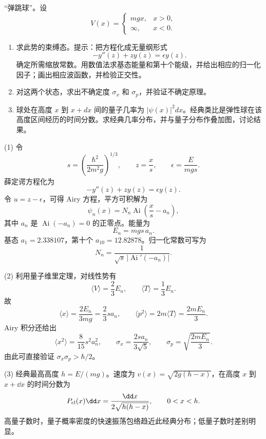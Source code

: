 \begin{question}
“弹跳球”。设
\[
V(x)=\begin{cases}mgx,&x>0,\\ \infty,&x<0.
\end{cases}
\]
\begin{enumerate}
\item 求此势的束缚态。提示：把方程化成无量纲形式
\[
-y''(z)+zy(z)=\epsilon y(z).
\]
确定所需缩放常数。用数值法求基态能量和第十个能级，并给出相应的归一化因子；画出相应波函数，并检验正交性。
\item 对这两个状态，求出不确定度 $\sigma_x$ 和 $\sigma_p$，并验证不确定原理。
\item 球处在高度 $x$ 到 $x+dx$ 间的量子几率为 $|\psi(x)|^2dx$。经典类比是弹性球在该高度区间经历的时间分数。求经典几率分布，并与量子分布作叠加图，讨论结果。
\end{enumerate}
\end{question}
\begin{solution}
(1) 令
\[
s=\left(\frac{\hbar^2}{2m^2g}\right)^{1/3},
\qquad
z=\frac{x}{s},
\qquad
\epsilon=\frac{E}{mgs}.
\]
薛定谔方程化为
\[
-y''(z)+zy(z)=\epsilon y(z).
\]
令 $u=z-\epsilon$，可得 Airy 方程，平方可积解为
\[
\psi_n(x)=N_n\operatorname{Ai}\left(\frac{x}{s}-a_n\right),
\]
其中 $a_n$ 是 $\operatorname{Ai}(-a_n)=0$ 的正零点。能量为
\[
E_n=mgs\,a_n.
\]
基态 $a_1=2.338107$，第十个 $a_{10}=12.82878$。归一化常数可写为
\[
N_n=\frac1{\sqrt{s}\,|\operatorname{Ai}'(-a_n)|}.
\]

(2) 利用量子维里定理，对线性势有
\[
\langle V\rangle=\frac23E_n,
\qquad
\langle T\rangle=\frac13E_n.
\]
故
\[
\langle x\rangle=\frac{2E_n}{3mg}=\frac23sa_n,
\qquad
\langle p^2\rangle=2m\langle T\rangle=\frac{2mE_n}{3}.
\]
Airy 积分还给出
\[
\langle x^2\rangle=\frac{8}{15}s^2a_n^2,
\qquad
\sigma_x=\frac{2sa_n}{3\sqrt5},
\qquad
\sigma_p=\sqrt{\frac{2mE_n}{3}}.
\]
由此可直接验证 $\sigma_x\sigma_p>\hbar/2$。

(3) 经典最高高度 $h=E/(mg)$。速度为 $v(x)=\sqrt{2g(h-x)}$，在高度 $x$ 到 $x+\dd x$ 的时间分数为
\[
P_{\rm cl}(x)\dd x=\frac{\dd x}{2\sqrt{h(h-x)}},
\qquad 0<x<h.
\]
高量子数时，量子概率密度的快速振荡包络趋近此经典分布；低量子数时差别明显。
\end{solution}

